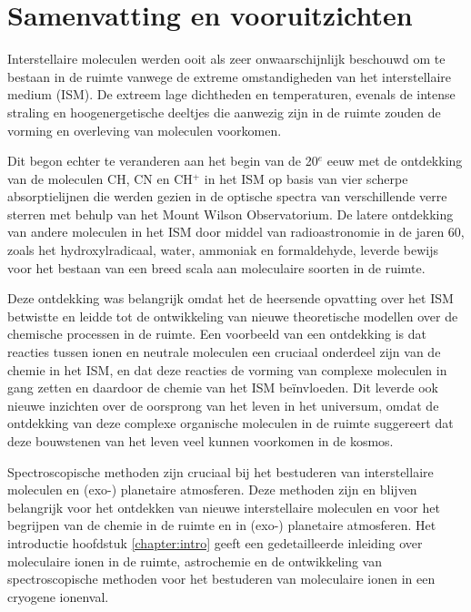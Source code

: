 \chapter{Samenvatting en vooruitzichten}

{
Interstellaire moleculen werden ooit als zeer onwaarschijnlijk beschouwd om te bestaan in de ruimte vanwege de extreme omstandigheden van het interstellaire medium (ISM). De extreem lage dichtheden en temperaturen, evenals de intense straling en hoogenergetische deeltjes die aanwezig zijn in de ruimte zouden de vorming en overleving van moleculen voorkomen. 

Dit begon echter te veranderen aan het begin van de 20$^e$ eeuw met de ontdekking van de moleculen CH, CN en CH$^+$ in het ISM op basis van vier scherpe absorptielijnen die werden gezien in de optische spectra van verschillende verre sterren met behulp van het Mount Wilson Observatorium. De latere ontdekking van andere moleculen in het ISM door middel van radioastronomie in de jaren 60, zoals het hydroxylradicaal, water, ammoniak en formaldehyde, leverde bewijs voor het bestaan van een breed scala aan moleculaire soorten in de ruimte. 

Deze ontdekking was belangrijk omdat het de heersende opvatting over het ISM betwistte en leidde tot de ontwikkeling van nieuwe theoretische modellen over de chemische processen in de ruimte. Een voorbeeld van een ontdekking is dat reacties tussen ionen en neutrale moleculen een cruciaal onderdeel zijn van de chemie in het ISM, en dat deze reacties de vorming van complexe moleculen in gang zetten en daardoor de chemie van het ISM beïnvloeden. Dit leverde ook nieuwe inzichten over de oorsprong van het leven in het universum, omdat de ontdekking van deze complexe organische moleculen in de ruimte suggereert dat deze bouwstenen van het leven veel kunnen voorkomen in de kosmos.

Spectroscopische methoden zijn cruciaal bij het bestuderen van interstellaire moleculen en (exo-) planetaire atmosferen. Deze methoden zijn en blijven belangrijk voor het ontdekken van nieuwe interstellaire moleculen en voor het begrijpen van de chemie in de ruimte en in (exo-) planetaire atmosferen. Het introductie hoofdstuk \ref{chapter:intro} geeft een gedetailleerde inleiding over moleculaire ionen in de ruimte, astrochemie en de ontwikkeling van spectroscopische methoden voor het bestuderen van moleculaire ionen in een cryogene ionenval.

}
